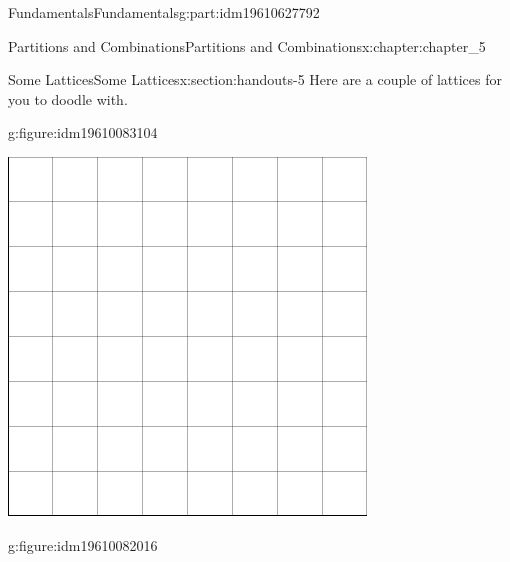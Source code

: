 \documentclass[oneside,10pt,]{book}
\numberwithin{equation}{section}
\begin{document}
\begin{partptx}{Fundamentals}{}{Fundamentals}{}{}{g:part:idm19610627792}
\begin{chapterptx}{Partitions and Combinations}{}{Partitions and Combinations}{}{}{x:chapter:chapter_5}
%
\begin{sectionptx}{Some Lattices}{}{Some Lattices}{}{}{x:section:handouts-5}
Here are a couple of lattices for you to doodle with.%
\begin{figureptx}{}{g:figure:idm19610083104}{}%
\begin{image}{0.175}{0.65}{0.175}%
\includegraphics[width=\linewidth]{images/graphpaper8.png}
\end{image}%
\tcblower
\end{figureptx}%
\begin{figureptx}{}{g:figure:idm19610082016}{}%
\begin{image}{0.175}{0.65}{0.175}%

\end{image}
\end{figureptx}
\end{sectionptx}
\end{chapterptx}
\end{partptx}
\end{document}
